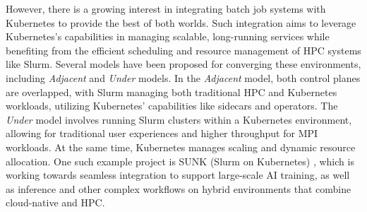 However, there is a growing interest in integrating batch job systems with Kubernetes to provide the best of both worlds. Such integration aims to leverage Kubernetes's capabilities in managing scalable, long-running services while benefiting from the efficient scheduling and resource management of HPC systems like Slurm. Several models have been proposed for converging these environments, including \textit{Adjacent} and \textit{Under} models. In the \textit{Adjacent} model, both control planes are overlapped, with Slurm managing both traditional HPC and Kubernetes workloads, utilizing Kubernetes' capabilities like sidecars and operators. The \textit{Under} model involves running Slurm clusters within a Kubernetes environment, allowing for traditional user experiences and higher throughput for MPI workloads. At the same time, Kubernetes manages scaling and dynamic resource allocation. One such example project is SUNK (Slurm on Kubernetes) \cite{SlurmK8sIntegration}, which is working towards seamless integration to support large-scale AI training, as well as inference and other complex workflows on hybrid environments that combine cloud-native and HPC.
